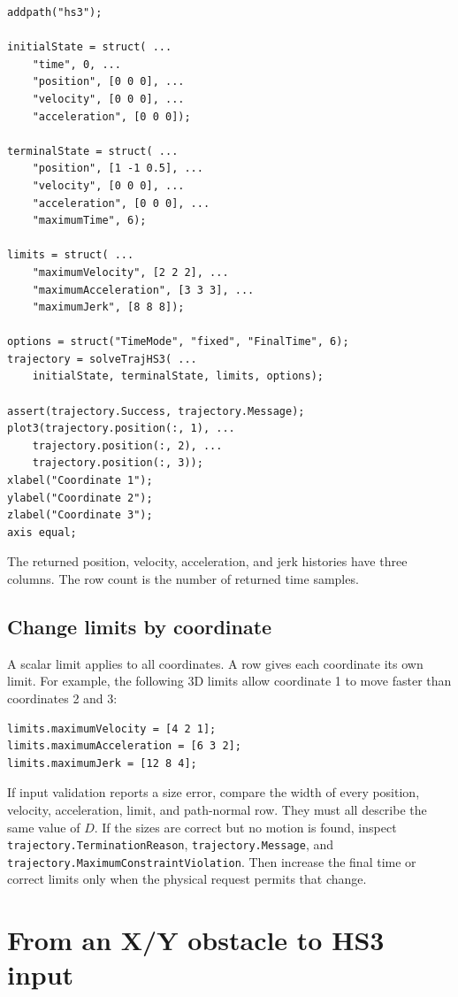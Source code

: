 \documentclass[10pt,letterpaper]{article}
\newcommand{\file}[1]{\nolinkurl{#1}}
\begin{document}
\begin{lstlisting}
addpath("hs3");

initialState = struct( ...
    "time", 0, ...
    "position", [0 0 0], ...
    "velocity", [0 0 0], ...
    "acceleration", [0 0 0]);

terminalState = struct( ...
    "position", [1 -1 0.5], ...
    "velocity", [0 0 0], ...
    "acceleration", [0 0 0], ...
    "maximumTime", 6);

limits = struct( ...
    "maximumVelocity", [2 2 2], ...
    "maximumAcceleration", [3 3 3], ...
    "maximumJerk", [8 8 8]);

options = struct("TimeMode", "fixed", "FinalTime", 6);
trajectory = solveTrajHS3( ...
    initialState, terminalState, limits, options);

assert(trajectory.Success, trajectory.Message);
plot3(trajectory.position(:, 1), ...
    trajectory.position(:, 2), ...
    trajectory.position(:, 3));
xlabel("Coordinate 1");
ylabel("Coordinate 2");
zlabel("Coordinate 3");
axis equal;
\end{lstlisting}

The returned position, velocity, acceleration, and jerk histories have three
columns. The row count is the number of returned time samples.

\subsection{Change limits by coordinate}

A scalar limit applies to all coordinates. A row gives each coordinate its own
limit. For example, the following 3D limits allow coordinate 1 to move faster
than coordinates 2 and 3:

\begin{lstlisting}
limits.maximumVelocity = [4 2 1];
limits.maximumAcceleration = [6 3 2];
limits.maximumJerk = [12 8 4];
\end{lstlisting}

If input validation reports a size error, compare the width of every position,
velocity, acceleration, limit, and path-normal row. They must all describe the
same value of $D$. If the sizes are correct but no motion is found, inspect
\file{trajectory.TerminationReason}, \file{trajectory.Message}, and
\file{trajectory.MaximumConstraintViolation}. Then increase the final time or
correct limits only when the physical request permits that change.

\section{From an X/Y obstacle to HS3 input}\label{sec:obstacles}
\end{document}
